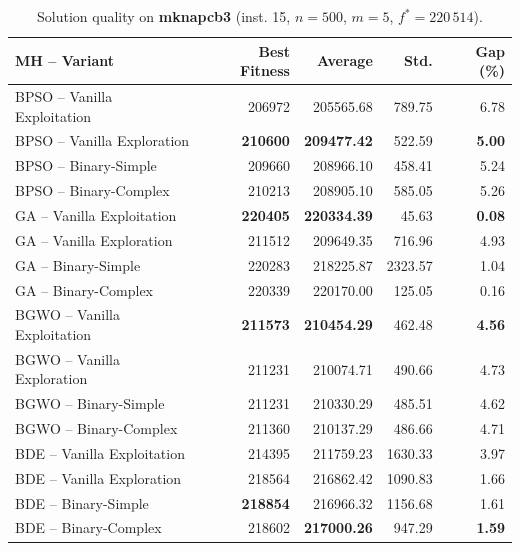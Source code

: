 \documentclass[journal,article,submit,moreauthors]{Definitions/mdpi}
\begin{document}
\begin{table}[htbp]
  \centering
  \small
  \caption{Solution quality on \textbf{mknapcb3} (inst. 15, $n=500$, $m=5$, $f^*=220\,514$).}
  \label{tab:calidad_mknapcb3_15}
  \begin{tabular}{lrrrr}
    \toprule
    \textbf{MH -- Variant} &
    \textbf{Best Fitness} &
    \textbf{Average} &
    \textbf{Std.} &
    \textbf{Gap (\%)} \\
    \midrule
    BPSO -- Vanilla Exploitation &         206972 &        205565.68 & 789.75 &         6.78 \\
    BPSO -- Vanilla Exploration  & \textbf{210600} & \textbf{209477.42} & 522.59 & \textbf{5.00} \\
    BPSO -- Binary-Simple        &         209660 &        208966.10 & 458.41 &         5.24 \\
    BPSO -- Binary-Complex       &         210213 &        208905.10 & 585.05 &         5.26 \\
    \midrule
    GA -- Vanilla Exploitation   & \textbf{220405} & \textbf{220334.39} &  45.63 & \textbf{0.08} \\
    GA -- Vanilla Exploration    &         211512 &        209649.35 & 716.96 &         4.93 \\
    GA -- Binary-Simple          &         220283 &        218225.87 & 2323.57 &         1.04 \\
    GA -- Binary-Complex         &         220339 &        220170.00 & 125.05 &         0.16 \\
    \midrule
    BGWO -- Vanilla Exploitation & \textbf{211573} & \textbf{210454.29} & 462.48 & \textbf{4.56} \\
    BGWO -- Vanilla Exploration  &         211231 &        210074.71 & 490.66 &         4.73 \\
    BGWO -- Binary-Simple        &         211231 &        210330.29 & 485.51 &         4.62 \\
    BGWO -- Binary-Complex       &         211360 &        210137.29 & 486.66 &         4.71 \\
    \midrule
    BDE -- Vanilla Exploitation  &         214395 &        211759.23 & 1630.33 &         3.97 \\
    BDE -- Vanilla Exploration   &         218564 &        216862.42 & 1090.83 &         1.66 \\
    BDE -- Binary-Simple         & \textbf{218854} &        216966.32 & 1156.68 &         1.61 \\
    BDE -- Binary-Complex        &         218602 & \textbf{217000.26} & 947.29 & \textbf{1.59} \\
    \bottomrule
  \end{tabular}
\end{table}
\end{document}
